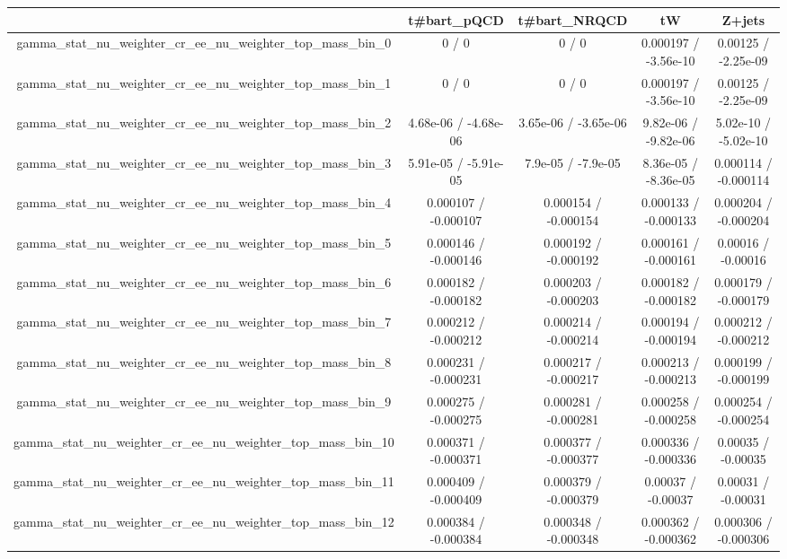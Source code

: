 \documentclass[10pt]{article}
\begin{document}
\begin{table}[htbp]
\begin{center}
\begin{tabular}{|c|c|c|c|c|}
\hline 
      & t#bar{t}_{pQCD}      & t#bar{t}_{NRQCD}      & tW      & Z+jets \\ 
\hline 
  gamma_stat_nu_weighter_cr_ee_nu_weighter_top_mass_bin_0 & 0 / 0 & 0 / 0 & 0.000197 / -3.56e-10 & 0.00125 / -2.25e-09 \\ 
  gamma_stat_nu_weighter_cr_ee_nu_weighter_top_mass_bin_1 & 0 / 0 & 0 / 0 & 0.000197 / -3.56e-10 & 0.00125 / -2.25e-09 \\ 
  gamma_stat_nu_weighter_cr_ee_nu_weighter_top_mass_bin_2 & 4.68e-06 / -4.68e-06 & 3.65e-06 / -3.65e-06 & 9.82e-06 / -9.82e-06 & 5.02e-10 / -5.02e-10 \\ 
  gamma_stat_nu_weighter_cr_ee_nu_weighter_top_mass_bin_3 & 5.91e-05 / -5.91e-05 & 7.9e-05 / -7.9e-05 & 8.36e-05 / -8.36e-05 & 0.000114 / -0.000114 \\ 
  gamma_stat_nu_weighter_cr_ee_nu_weighter_top_mass_bin_4 & 0.000107 / -0.000107 & 0.000154 / -0.000154 & 0.000133 / -0.000133 & 0.000204 / -0.000204 \\ 
  gamma_stat_nu_weighter_cr_ee_nu_weighter_top_mass_bin_5 & 0.000146 / -0.000146 & 0.000192 / -0.000192 & 0.000161 / -0.000161 & 0.00016 / -0.00016 \\ 
  gamma_stat_nu_weighter_cr_ee_nu_weighter_top_mass_bin_6 & 0.000182 / -0.000182 & 0.000203 / -0.000203 & 0.000182 / -0.000182 & 0.000179 / -0.000179 \\ 
  gamma_stat_nu_weighter_cr_ee_nu_weighter_top_mass_bin_7 & 0.000212 / -0.000212 & 0.000214 / -0.000214 & 0.000194 / -0.000194 & 0.000212 / -0.000212 \\ 
  gamma_stat_nu_weighter_cr_ee_nu_weighter_top_mass_bin_8 & 0.000231 / -0.000231 & 0.000217 / -0.000217 & 0.000213 / -0.000213 & 0.000199 / -0.000199 \\ 
  gamma_stat_nu_weighter_cr_ee_nu_weighter_top_mass_bin_9 & 0.000275 / -0.000275 & 0.000281 / -0.000281 & 0.000258 / -0.000258 & 0.000254 / -0.000254 \\ 
  gamma_stat_nu_weighter_cr_ee_nu_weighter_top_mass_bin_10 & 0.000371 / -0.000371 & 0.000377 / -0.000377 & 0.000336 / -0.000336 & 0.00035 / -0.00035 \\ 
  gamma_stat_nu_weighter_cr_ee_nu_weighter_top_mass_bin_11 & 0.000409 / -0.000409 & 0.000379 / -0.000379 & 0.00037 / -0.00037 & 0.00031 / -0.00031 \\ 
  gamma_stat_nu_weighter_cr_ee_nu_weighter_top_mass_bin_12 & 0.000384 / -0.000384 & 0.000348 / -0.000348 & 0.000362 / -0.000362 & 0.000306 / -0.000306 \\ 

\end{tabular}
\end{center}
\end{table}
\end{document}
